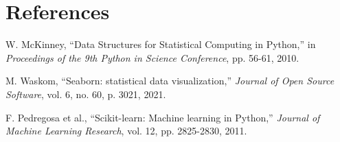 \documentclass[12pt,a4paper]{article}
\begin{document}
\section{References}
\begin{enumerate}[label={[\arabic*]}]
\item W. McKinney, ``Data Structures for Statistical Computing in Python,'' in \textit{Proceedings of the 9th Python in Science Conference}, pp. 56-61, 2010.
\item M. Waskom, ``Seaborn: statistical data visualization,'' \textit{Journal of Open Source Software}, vol. 6, no. 60, p. 3021, 2021.
\item F. Pedregosa et al., ``Scikit-learn: Machine learning in Python,'' \textit{Journal of Machine Learning Research}, vol. 12, pp. 2825-2830, 2011.
\end{enumerate}
\end{document}

